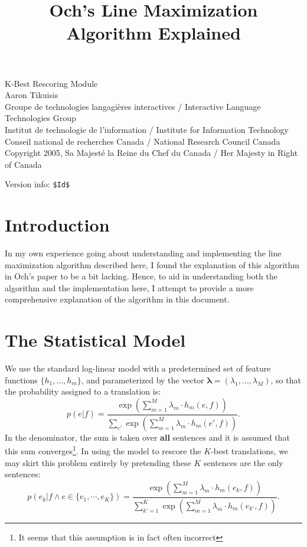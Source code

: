 \documentclass[12pt]{amsart}
\begin{document}
\title{Och's Line Maximization Algorithm Explained}
\maketitle

{\tiny
\noindent
K-Best Rescoring Module\\
Aaron Tikuisis\\
Groupe de technologies langagi{\`e}res interactives / Interactive Language Technologies Group\\
Institut de technologie de l'information / Institute for Information Technology\\
Conseil national de recherches Canada / National Research Council Canada\\
Copyright 2005, Sa Majest{\'e} la Reine du Chef du Canada / Her Majesty in Right of Canada
}

{\tiny
\noindent
Version info: \verb+$Id$+
}
\\

\section{Introduction\label{sec:intro}}
In my own experience going about understanding and implementing the line maximization algorithm described here, I found the explanation of this algorithm in Och's paper to be a bit lacking.
Hence, to aid in understanding both the algorithm and the implementation here, I attempt to provide a more comprehensive explanation of the algorithm in this document.

\section{The Statistical Model\label{sec:model}}
We use the standard log-linear model with a predetermined set of feature functions $\{h_1, \dots , h_m\}$, and parameterized by the vector $\boldsymbol{\lambda} = (\lambda_1, \dots , \lambda_M)$, so that the probability assigned to a translation is:
\[ p(e|f) = \frac
{\exp \left( \sum_{m=1}^M \lambda_m \cdot h_m(e,f) \right)}
{\sum_{e'} \exp \left( \sum_{m=1}^M \lambda_m \cdot h_m(e',f) \right)}. \]
In the denominator, the sum is taken over \textbf{all} sentences and it is assumed that this sum converges\footnote{It seems that this assumption is in fact often incorrect}.
In using the model to rescore the $K$-best translations, we may skirt this problem entirely by pretending these $K$ sentences are the only sentences:
\[ p(e_k|f \land e \in \{e_1, \cdots , e_K\}) = \frac
{\exp \left( \sum_{m=1}^M \lambda_m \cdot h_m(e_k,f) \right)}
{\sum_{k'=1}^K \exp \left( \sum_{m=1}^M \lambda_m \cdot h_m(e_{k'},f) \right)}. \]
\end{document}

